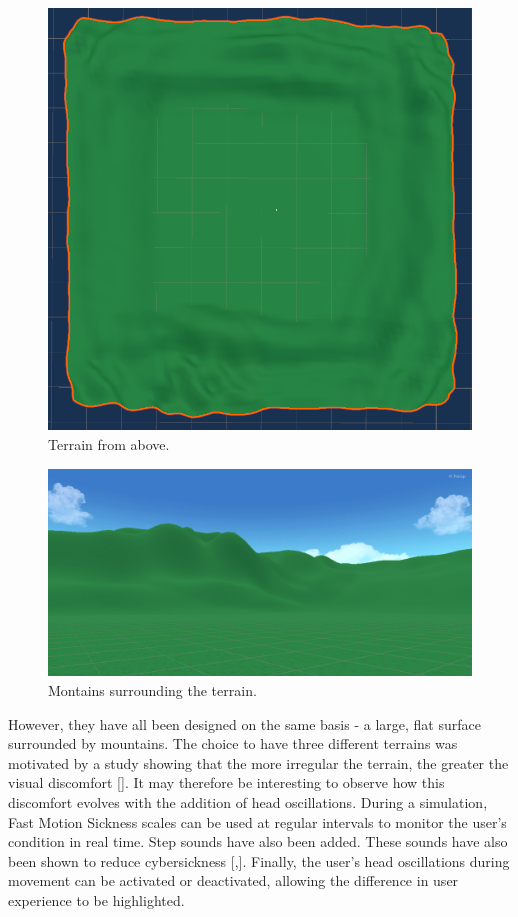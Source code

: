 \documentclass[american]{acmtog} %
\begin{document}
\begin{figure}[H]
\centerline{\includegraphics[width=\columnwidth]{figures/terrain.png}}
\caption{Terrain from above.}
    \label{fig:terrain}
\end{figure}

\begin{figure}[H]
\centerline{\includegraphics[width=\columnwidth]{figures/montains.png}}
\caption{Montains surrounding the terrain.}
    \label{fig:mountains}
\end{figure}

However, they have all been designed on the same basis - a large, flat surface surrounded by mountains. The choice to have three different terrains was motivated by a study showing that the more irregular the terrain, the greater the visual discomfort [\cite{bumpy_ride}]. It may therefore be interesting to observe how this discomfort evolves with the addition of head oscillations. During a simulation, Fast Motion Sickness scales can be used at regular intervals to monitor the user's condition in real time. Step sounds have also been added. These sounds have also been shown to reduce cybersickness [\cite{audio_in_vr},\cite{walking_vibe}]. Finally, the user's head oscillations during movement can be activated or deactivated, allowing the difference in user experience to be highlighted.
\end{document}
